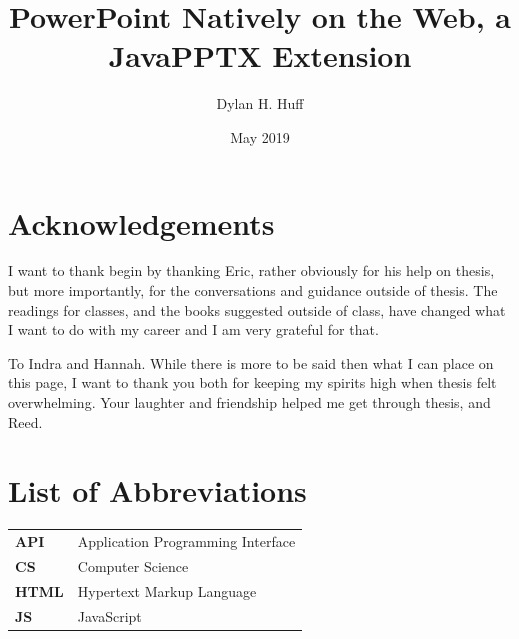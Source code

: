 \documentclass[12pt,twoside]{reedthesis}
\title{PowerPoint Natively on the Web, a JavaPPTX Extension}
\author{Dylan H. Huff}
\date{May 2019}
\begin{document}
  \maketitle
  \frontmatter %
  \pagestyle{empty} %

    \chapter*{Acknowledgements}
	I want to thank begin by thanking Eric, rather obviously for his help on thesis, but more importantly, for the conversations and guidance outside of thesis. The readings for classes, and the books suggested outside of class, have changed what I want to do with my career and I am very grateful for that. 
	
	To Indra and Hannah. While there is more to be said then what I can place on this page, I want to thank you both for keeping my spirits high when thesis felt overwhelming. Your laughter and friendship helped me get through thesis, and Reed. 

	
	

    \chapter*{List of Abbreviations}
	\begin{table}[h]
	\centering %
	\begin{tabular}{ll}
		\textbf{API} & Application Programming Interface\\ 
		\textbf{CS}   & Computer Science\\
		\textbf{HTML} & Hypertext Markup Language\\
		\textbf{JS}  	&  JavaScript\\
	\end{tabular}
	\end{table}
	

    \tableofcontents
    \listoffigures
\end{document}

